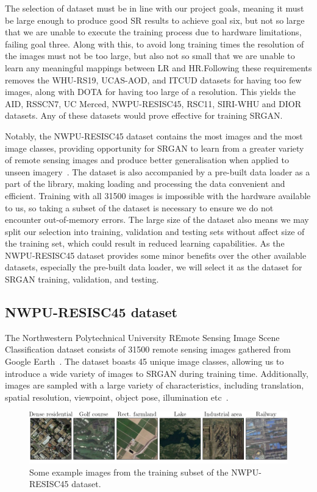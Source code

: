 The selection of dataset must be in line with our project goals, meaning it must be large enough to produce good SR results to achieve goal six, but not so large that we are unable to execute the training process due to hardware limitations, failing goal three. Along with this, to avoid long training times the resolution of the images must not be too large, but also not so small that we are unable to learn any meaningful mappings between LR and HR.\@  Following these requirements removes the WHU-RS19, UCAS-AOD, and ITCUD datasets for having too few images, along with DOTA for having too large of a resolution. This yields the AID, RSSCN7, UC Merced, NWPU-RESISC45, RSC11, SIRI-WHU and DIOR datasets. Any of these datasets would prove effective for training SRGAN.\@

Notably, the NWPU-RESISC45 dataset contains the most images and the most image classes, providing opportunity for SRGAN to learn from a greater variety of remote sensing images and produce better generalisation when applied to unseen imagery~\cite{resisc45}. The dataset is also accompanied by a pre-built data loader as a part of the   library, making loading and processing the data convenient and efficient. Training with all 31500 images is impossible with the hardware available to us, so taking a subset of the dataset is necessary to ensure we do not encounter out-of-memory errors. The large size of the dataset also means we may split our selection into training, validation and testing sets without affect size of the training set, which could result in reduced learning capabilities. As the NWPU-RESISC45 dataset provides some minor benefits over the other available datasets, especially the pre-built data loader, we will select it as the dataset for SRGAN training, validation, and testing. 

\subsection{NWPU-RESISC45 dataset}\label{subsec:resisc45}
The Northwestern Polytechnical University REmote Sensing Image Scene Classification dataset consists of 31500 remote sensing images gathered from Google Earth~\cite{resisc45}. The dataset boasts 45 unique image classes, allowing us to introduce a wide variety of images to SRGAN during training time. Additionally, images are sampled with a large variety of characteristics, including translation, spatial resolution, viewpoint, object pose, illumination etc~\cite{resisc45}.
\begin{figure}
    \includegraphics[width=\linewidth]{./assets/resisc45_example.png}
    \caption{Some example images from the training subset of the NWPU-RESISC45 dataset.}
    \label{fig:resisc45_examples}
\end{figure}

